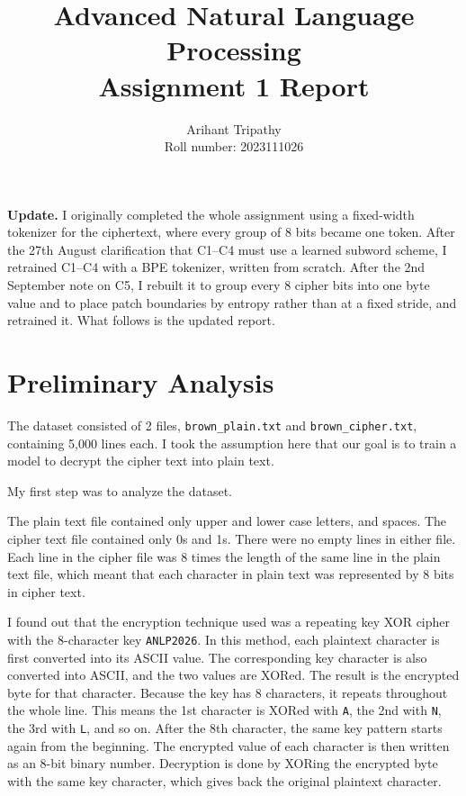 \documentclass[12pt]{article}
\title{\vspace{-1.2cm}Advanced Natural Language Processing\\Assignment 1 Report}
\author{Arihant Tripathy\\\normalsize Roll number: 2023111026}
\date{}
\begin{document}
\maketitle
\vspace{-1cm}

\noindent\textbf{Update.} I originally completed the whole assignment
using a fixed-width tokenizer for the ciphertext, where every group of 8 bits
became one token. After the 27th August clarification that C1--C4 must use a 
learned subword scheme, I retrained C1--C4 with a BPE tokenizer, written from scratch. 
After the 2nd September note on C5, I rebuilt it to group every 8 cipher bits 
into one byte value and to place patch boundaries by entropy rather than at a
fixed stride, and retrained it. What follows is the updated report.

\section{Preliminary Analysis}

The dataset consisted of 2 files, \texttt{brown\_plain.txt} and
\texttt{brown\_cipher.txt}, containing 5,000 lines each. I took the assumption
here that our goal is to train a model to decrypt the cipher text into plain
text.

My first step was to analyze the dataset.

The plain text file contained only upper and lower case letters, and spaces. The
cipher text file contained only 0s and 1s. There were no empty lines in either
file. Each line in the cipher file was 8 times the length of the same line in
the plain text file, which meant that each character in plain text was
represented by 8 bits in cipher text.

I found out that the encryption technique used was a repeating key XOR cipher
with the 8-character key \texttt{ANLP2026}. In this method, each plaintext
character is first converted into its ASCII value. The corresponding key
character is also converted into ASCII, and the two values are XORed. The result
is the encrypted byte for that character. Because the key has 8 characters, it
repeats throughout the whole line. This means the 1st character is XORed with
\texttt{A}, the 2nd with \texttt{N}, the 3rd with \texttt{L}, and so on. After
the 8th character, the same key pattern starts again from the beginning. The
encrypted value of each character is then written as an 8-bit binary number.
Decryption is done by XORing the encrypted byte with the same key character,
which gives back the original plaintext character.
\end{document}
